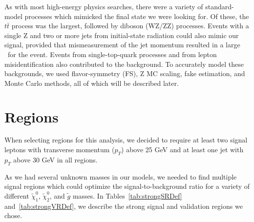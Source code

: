As with most high-energy physics searches, there were a variety of standard-model processes which mimicked the final state we were looking for. Of these, the $t\bar{t}$ process was the largest, followed by diboson (WZ/ZZ) processes. Events with a single Z and two or more jets from initial-state radiation could also mimic our signal, provided that mismeasurement of the jet momentum resulted in a large \MET\ for the event. Events from single-top-quark processes and from lepton misidentification also contributed to the background. To accurately model these backgrounds, we used flavor-symmetry (FS), Z MC scaling, fake estimation, and Monte Carlo methods, all of which will be described later.

\section{Regions}

When selecting regions for this analysis, we decided to require at least two signal leptons with transverse momentum ($p_T$) above 25 GeV and at least one jet with $p_T$ above 30 GeV in all regions.

As we had several unknown masses in our models, we needed to find multiple signal regions which could optimize the signal-to-background ratio for a variety of different $\tilde{\chi}^0_1$, $\tilde{\chi}^0_2$, and $\tilde{g}$ masses. In Tables~\ref{tab:strongSRDef} and~\ref{tab:strongVRDef}, we describe the strong signal and validation regions we chose.

